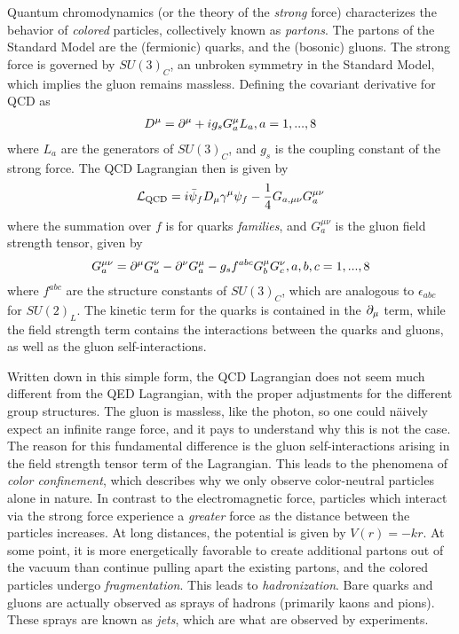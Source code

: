 Quantum chromodynamics (or the theory of the \textit{strong} force) characterizes the behavior of \textit{colored} particles, collectively known as \textit{partons}.
The partons of the Standard Model are the (fermionic) quarks, and the (bosonic) gluons.
The strong force is governed by $SU(3)_C$, an unbroken symmetry in the Standard Model, which implies the gluon remains massless.
Defining the covariant derivative for QCD as
\begin{align}
D^\mu = \partial^\mu + ig_s G^\mu_a L_a, a = 1,...,8
\end{align}
where $L_a$ are the generators of $SU(3)_C$, and $g_s$ is the coupling constant of the strong force.
The QCD Lagrangian then is given by
\begin{equation}
\mathcal{L}_{\text{QCD}} = i \bar{\psi}_f D_\mu \gamma^\mu \psi_f - \frac{1}{4} G_{a,\mu\nu} G_a^{\mu\nu}
\end{equation}
where the summation over $f$ is for quarks \textit{families}, and $ G_a^{\mu\nu}$ is the gluon field strength tensor, given by
\begin{equation}
G^{\mu\nu}_a = \partial^\mu G^\nu_a - \partial^\nu G^\mu_a - g_s f^{abc} G^\mu_b G^\nu_c,  a,b,c = 1,...,8
\end{equation}
where $f^{abc}$ are the structure constants of $SU(3)_C$, which are analogous to $\epsilon_{abc}$ for $SU(2)_L$.
The kinetic term for the quarks is contained in the $\partial_\mu$ term, while the field strength term contains the interactions between the quarks and gluons, as well as the gluon self-interactions.

Written down in this simple form, the QCD Lagrangian does not seem much different from the QED Lagrangian, with the proper adjustments for the different group structures.
The gluon is massless, like the photon, so one could n\"aively expect an infinite range force, and it pays to understand why this is not the case.
The reason for this fundamental difference is the gluon self-interactions  arising in the field strength tensor term of the Lagrangian.
This leads to the phenomena of \textit{color confinement}, which describes why we only observe color-neutral particles alone in nature.
In contrast to the electromagnetic force, particles which interact via the strong force experience a \textit{greater} force as the distance between the particles increases.
At long distances, the potential is given by $V(r) = -kr$.
At some point, it is more energetically favorable to create additional partons out of the vacuum than continue pulling apart the existing partons, and the colored particles undergo \textit{fragmentation}.
This leads to \textit{hadronization}.
Bare quarks and gluons are actually observed as sprays of hadrons (primarily kaons and pions).
These sprays are known as \textit{jets}, which are what are observed by experiments.

